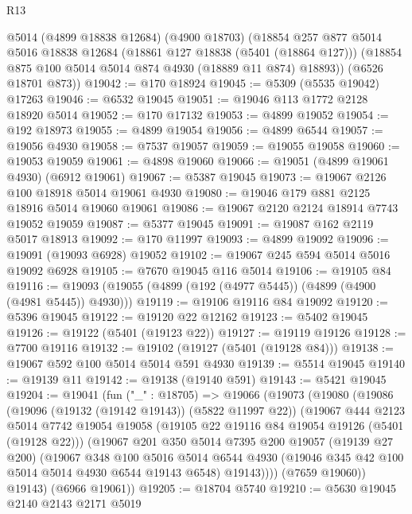 \begin{lexlean}{R13}
\begin{coremodule}
      @5014
      (@4899 @18838 @12684)
      (@4900 @18703)
      (@18854
        @257
        @877
        @5014
        @5016
        @18838
        @12684
        (@18861 @127 @18838 (@5401 (@18864 @127)))
        (@18854 @875 @100 @5014 @5014 @874 @4930 (@18889 @11 @874) @18893))
      (@6526 @18701 @873))
@19042 := @170 @18924
@19045 := @5309 (@5535 @19042) @17263
@19046 := @6532 @19045
@19051 := @19046 @113 @1772 @2128 @18920 @5014
@19052 := @170 @17132
@19053 := @4899 @19052
@19054 := @192 @18973
@19055 := @4899 @19054
@19056 := @4899 @6544
@19057 := @19056 @4930
@19058 := @7537 @19057
@19059 := @19055 @19058
@19060 := @19053 @19059
@19061 := @4898 @19060
@19066 := @19051 (@4899 @19061 @4930) (@6912 @19061)
@19067 := @5387 @19045
@19073 := @19067 @2126 @100 @18918 @5014 @19061 @4930
@19080 := @19046 @179 @881 @2125 @18916 @5014 @19060 @19061
@19086 := @19067 @2120 @2124 @18914 @7743 @19052 @19059
@19087 := @5377 @19045
@19091 := @19087 @162 @2119 @5017 @18913
@19092 := @170 @11997
@19093 := @4899 @19092
@19096 := @19091 (@19093 @6928) @19052
@19102 := @19067 @245 @594 @5014 @5016 @19092 @6928
@19105 := @7670 @19045 @116 @5014
@19106 := @19105 @84
@19116 := @19093 (@19055 (@4899 (@192 (@4977 @5445)) (@4899 (@4900 (@4981 @5445)) @4930)))
@19119 := @19106 @19116 @84 @19092
@19120 := @5396 @19045
@19122 := @19120 @22 @12162
@19123 := @5402 @19045
@19126 := @19122 (@5401 (@19123 @22))
@19127 := @19119 @19126
@19128 := @7700 @19116
@19132 := @19102 (@19127 (@5401 (@19128 @84)))
@19138 := @19067 @592 @100 @5014 @5014 @591 @4930
@19139 := @5514 @19045
@19140 := @19139 @11
@19142 := @19138 (@19140 @591)
@19143 := @5421 @19045
@19204 := @19041
    (fun ("_" : @18705) =>
    @19066
      (@19073
        (@19080
          (@19086
            (@19096 (@19132 (@19142 @19143)) (@5822 @11997 @22))
            (@19067
              @444
              @2123
              @5014
              @7742
              @19054
              @19058
              (@19105 @22 @19116 @84 @19054 @19126 (@5401 (@19128 @22)))
              (@19067
                @201
                @350
                @5014
                @7395
                @200
                @19057
                (@19139 @27 @200)
                (@19067
                  @348
                  @100
                  @5016
                  @5014
                  @6544
                  @4930
                  (@19046 @345 @42 @100 @5014 @5014 @4930 @6544 @19143 @6548)
                  @19143))))
          (@7659 @19060))
        @19143)
      (@6966 @19061))
@19205 := @18704 @5740
@19210 := @5630 @19045 @2140 @2143 @2171 @5019

\end{coremodule}
\end{lexlean}
